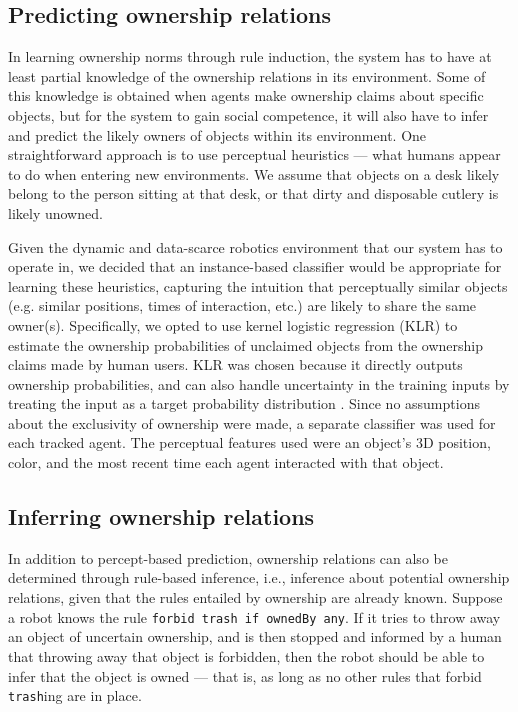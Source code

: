 \documentclass[letterpaper]{article} %
\begin{document}
\subsection{Predicting ownership relations}

In learning ownership norms through rule induction, the system has to have at least partial knowledge of the ownership relations in its environment. Some of this knowledge is obtained when agents make ownership claims about specific objects, but for the system to gain social competence, it will also have to infer and predict the likely owners of objects within its environment. One straightforward approach is to use perceptual heuristics --- what humans appear to do when entering new environments. We assume that objects on a desk likely belong to the person sitting at that desk, or that dirty and disposable cutlery is likely unowned.

Given the dynamic and data-scarce robotics environment that our system has to operate in, we decided that an instance-based classifier would be appropriate for learning these heuristics, capturing the intuition that perceptually similar objects (e.g. similar positions, times of interaction, etc.) are likely to share the same owner(s). Specifically, we opted to use kernel logistic regression (KLR) \cite{zhu2005kernel} to estimate the ownership probabilities of unclaimed objects from the ownership claims made by human users. KLR was chosen because it directly outputs ownership probabilities, and can also handle uncertainty in the training inputs by treating the input as a target probability distribution \cite{magder1997logistic}. Since no assumptions about the exclusivity of ownership were made, a separate classifier was used for each tracked agent. The perceptual features used were an object's 3D position, color, and the most recent time each agent interacted with that object.

\subsection{Inferring ownership relations}

In addition to percept-based prediction, ownership relations can also be determined through rule-based inference, i.e., inference about potential ownership relations, given that the rules entailed by ownership are already known. Suppose a robot knows the rule \texttt{\small{forbid trash if ownedBy any}}. If it tries to throw away an object of uncertain ownership, and is then stopped and informed by a human that throwing away that object is forbidden, then the robot should be able to infer that the object is owned --- that is, as long as no other rules that forbid \texttt{\small{trash}}ing are in place.
\end{document}
